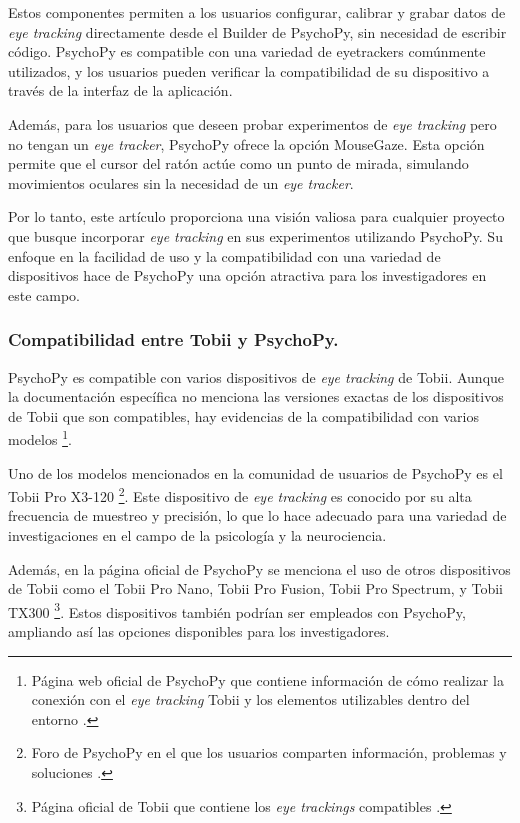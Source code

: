 Estos componentes permiten a los usuarios configurar, calibrar y grabar datos de \textit{eye tracking} directamente desde el Builder de PsychoPy, sin necesidad de escribir código. PsychoPy es compatible con una variedad de eyetrackers comúnmente utilizados, y los usuarios pueden verificar la compatibilidad de su dispositivo a través de la interfaz de la aplicación.

Además, para los usuarios que deseen probar experimentos de \textit{eye tracking} pero no tengan un \textit{eye tracker}, PsychoPy ofrece la opción MouseGaze. Esta opción permite que el cursor del ratón actúe como un punto de mirada, simulando movimientos oculares sin la necesidad de un \textit{eye tracker}.

Por lo tanto, este artículo proporciona una visión valiosa para cualquier proyecto que busque incorporar \textit{eye tracking} en sus experimentos utilizando PsychoPy. Su enfoque en la facilidad de uso y la compatibilidad con una variedad de dispositivos hace de PsychoPy una opción atractiva para los investigadores en este campo.

\subsubsection{Compatibilidad entre Tobii y PsychoPy.}
PsychoPy es compatible con varios dispositivos de \textit{eye tracking} de Tobii. Aunque la documentación específica no menciona las versiones exactas de los dispositivos de Tobii que son compatibles, hay evidencias de la compatibilidad con varios modelos \cite{TobiiPsychoPy}\footnote{Página web oficial de PsychoPy que contiene información de cómo realizar la conexión con el \textit{eye tracking} Tobii y los elementos utilizables dentro del entorno \cite{TobiiPsychoPy}.}. 

Uno de los modelos mencionados en la comunidad de usuarios de PsychoPy es el Tobii Pro X3-120 \cite{ForoTobiiPsychoPy}\footnote{Foro de PsychoPy en el que los usuarios comparten información, problemas y soluciones \cite{ForoTobiiPsychoPy}.}. Este dispositivo de \textit{eye tracking} es conocido por su alta frecuencia de muestreo y precisión, lo que lo hace adecuado para una variedad de investigaciones en el campo de la psicología y la neurociencia.

Además, en la página oficial de PsychoPy se menciona el uso de otros dispositivos de Tobii como el Tobii Pro Nano, Tobii Pro Fusion, Tobii Pro Spectrum, y Tobii TX300 \cite{SupportTobii}\footnote{Página oficial de Tobii que contiene los \textit{eye trackings} compatibles \cite{SupportTobii}.}. Estos dispositivos también podrían ser empleados con PsychoPy, ampliando así las opciones disponibles para los investigadores.


